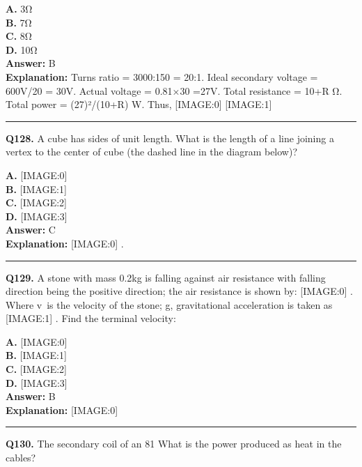 \documentclass[12pt]{article}
\begin{document}
\textbf{A.} 3Ω \\
\textbf{B.} 7Ω \\
\textbf{C.} 8Ω \\
\textbf{D.} 10Ω \\

\textbf{Answer:} B \\
\textbf{Explanation:} Turns ratio = 3000:150 = 20:1. Ideal secondary voltage = 600V/20 = 30V. Actual voltage = \sqrt{}0.81×30 =27V. Total resistance = 10+R Ω. Total power = (27)²/(10+R) W.
Thus,
[IMAGE:0]
[IMAGE:1]

\hrule
\vspace{1em}


\noindent
\textbf{Q128.} A cube has sides of unit length. What is the length of a line joining a vertex to the center of cube (the dashed line in the diagram below)?



\textbf{A.} [IMAGE:0] \\
\textbf{B.} [IMAGE:1] \\
\textbf{C.} [IMAGE:2] \\
\textbf{D.} [IMAGE:3] \\

\textbf{Answer:} C \\
\textbf{Explanation:} [IMAGE:0]
.

\hrule
\vspace{1em}


\noindent
\textbf{Q129.} A stone with mass 0.2kg is falling against air resistance with falling direction being the positive direction; the air resistance is shown by:
[IMAGE:0]
. Where v is the velocity of the stone; g, gravitational acceleration is taken as
[IMAGE:1]
. Find the terminal velocity:



\textbf{A.} [IMAGE:0] \\
\textbf{B.} [IMAGE:1] \\
\textbf{C.} [IMAGE:2] \\
\textbf{D.} [IMAGE:3] \\

\textbf{Answer:} B \\
\textbf{Explanation:} [IMAGE:0]

\hrule
\vspace{1em}


\noindent
\textbf{Q130.} The secondary coil of an 81%
What is the power produced as heat in the cables?
\end{document}
